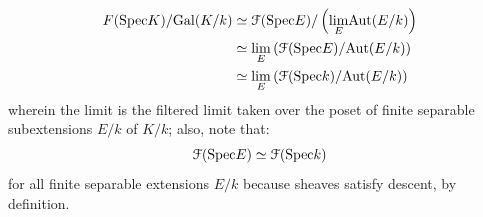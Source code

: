 \begin{corollary}
                    $$
                        \begin{aligned}
                            F(\mathrm{Spec} K)/\mathrm{Gal}(K/k) & \simeq \mathcal{F}(\mathrm{Spec} E)/\left(\underset{E}{\operatorname{lim}} \mathrm{Aut}(E/k)\right)
                            \\
                            & \simeq \underset{E}{\operatorname{lim}} \left(\mathcal{F}(\mathrm{Spec} E)/\mathrm{Aut}(E/k)\right)
                            \\
                            & \simeq \underset{E}{\operatorname{lim}} \left(\mathcal{F}(\mathrm{Spec} k)/\mathrm{Aut}(E/k)\right)
                        \end{aligned}
                    $$
                wherein the limit is the filtered limit taken over the poset of finite separable subextensions $E/k$ of $K/k$; also, note that:
                    $$\mathcal{F}(\mathrm{Spec} E) \simeq \mathcal{F}(\mathrm{Spec} k)$$
                for all finite separable extensions $E/k$ because sheaves satisfy descent, by definition.
            \end{corollary}
